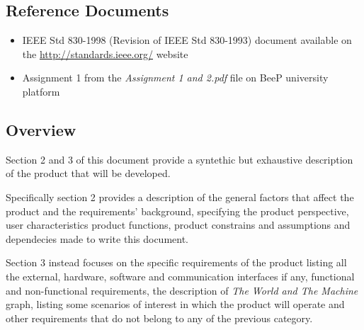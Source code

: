 	\subsection{Reference Documents}
	\begin{itemize}
		\item IEEE Std 830-1998 (Revision of IEEE Std 830-1993) document available on the \url{http://standards.ieee.org/} website
		\item Assignment 1 from the \emph{Assignment 1 and 2.pdf} file on BeeP university platform
	\end{itemize}
	\subsection{Overview}
		Section 2 and 3 of this document provide a syntethic but exhaustive description of the product that will be developed.
				
		Specifically section 2 provides a description of the general factors that affect the product and the requirements' background, specifying the product perspective, user characteristics product functions, product constrains and assumptions and dependecies made to write this document.
		
		Section 3 instead focuses on the specific requirements of the product listing all the external, hardware, software and communication interfaces if any, functional and non-functional requirements, the description of \emph{The World and The Machine} graph, listing some scenarios of interest in which the product will operate and other requirements that do not belong to any of the previous category. 
	
	